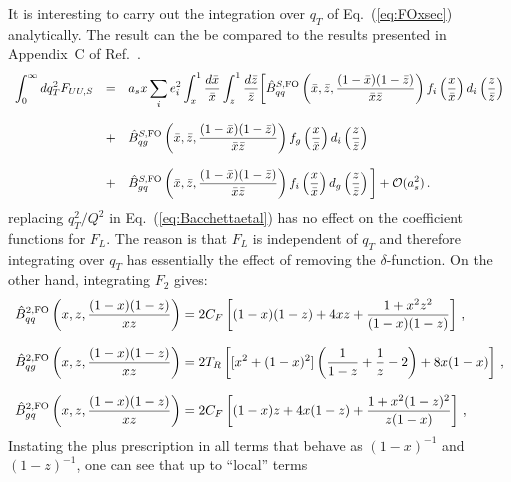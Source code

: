\documentclass[10pt,a4paper]{article}
\begin{document}
It is interesting to carry out the integration over $q_T$ of
Eq.~(\ref{eq:FOxsec}) analytically. The result can the be compared to
the results presented in Appendix~C of Ref.~\cite{deFlorian:1997zj}.
\begin{equation}
\begin{array}{rcl}
 \displaystyle \int_0^{\infty} dq_T^2 F_{UU,S}&=&\displaystyle 
  a_sx\sum_{i}e_i^2\int_x^1\frac{d\bar{x}}{\bar{x}}\int_z^1\frac{d\bar{z}}{\bar{z}}\bigg[\hat{B}_{qq}^{S,
    \rm FO}\left(\bar{x},\bar{z},\frac{(1-\bar{x})(1-\bar{z})}{\bar{x}\bar{z}}\right)f_i\left(\frac{x}{\bar{x}}\right)
              d_i\left(\frac{z}{\bar{z}}\right)\\
\\
&+&\displaystyle \hat{B}_{qg}^{S,
    \rm FO}\left(\bar{x},\bar{z},\frac{(1-\bar{x})(1-\bar{z})}{\bar{x}\bar{z}}\right)f_g\left(\frac{x}{\bar{x}}\right)
              d_i\left(\frac{z}{\bar{z}}\right)\\
\\
&+& \displaystyle \hat{B}_{gq}^{S,
    \rm FO}\left(\bar{x},\bar{z},\frac{(1-\bar{x})(1-\bar{z})}{\bar{x}\bar{z}}\right)f_i\left(\frac{x}{\bar{x}}\right)
              d_g\left(\frac{z}{\bar{z}}\right)\bigg]
+\mathcal{O}(a_s^2)\,.
\end{array}
\end{equation}
replacing $q_T^2/Q^2$ in Eq.~(\ref{eq:Bacchettaetal}) has no effect on
the coefficient functions for $F_L$. The reason is that $F_L$ is
independent of $q_T$ and therefore integrating over $q_T$ has
essentially the effect of removing the $\delta$-function. On the other
hand, integrating $F_2$ gives:
\begin{equation}
\begin{array}{l}
\displaystyle \hat{B}_{qq}^{2,\rm FO}\left(x,z,\frac{(1-{x})(1-{z})}{{x}{z}}\right) = 2C_F\left[(1-x)(1-z)+4xz+\frac{1+x^2z^2}{(1-x)(1-z)}\right]\,,\\
\\
\displaystyle \hat{B}_{qg}^{2,\rm FO}\left
  (x,z,\frac{(1-{x})(1-{z})}{{x}{z}}\right) = 2T_R\left[[x^2+(1-x)^2]\left(\frac{1}{1-z}+\frac1{z}-2\right)+8x(1-x)\right]\,,\\
\\
\displaystyle \hat{B}_{gq}^{2,\rm FO}\left (x,z,\frac{(1-{x})(1-{z})}{{x}{z}}\right) =
  2C_F\left[(1-x)z+4x(1-z)+\frac{1+x^2(1-z)^2}{z(1-x)}\right]\,,
\end{array}
\end{equation}
Instating the plus prescription in all terms that behave as
$(1-x)^{-1}$ and $(1-z)^{-1}$, one can see that up to ``local'' terms
\end{document}

